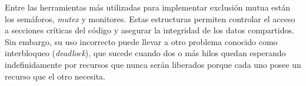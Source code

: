 Entre las herramientas más utilizadas para implementar exclusión mutua están los semáforos, \textit{mutex} y monitores. Estas estructuras permiten controlar el acceso a secciones críticas del código y asegurar la integridad de los datos compartidos. 
Sin embargo, su uso incorrecto puede llevar a otro problema conocido como interbloqueo (\textit{deadlock}), que sucede cuando dos o más hilos quedan esperando indefinidamente por recursos que nunca serán liberados porque cada uno posee un recurso que el otro necesita. 






    

